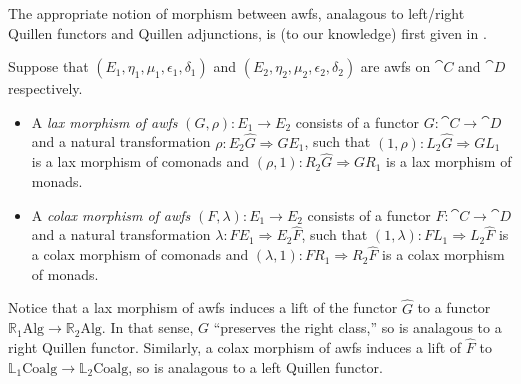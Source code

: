 The appropriate notion of morphism between awfs, analagous to left/right Quillen functors and Quillen adjunctions, is (to our knowledge) first given in \cite{riehl:nwfs-model}.

\begin{definition}
	Suppose that $(E_1,\eta_1,\mu_1,\epsilon_1,\delta_1)$ and $(E_2,\eta_2,\mu_2,\epsilon_2,\delta_2)$ are awfs on $\cat{C}$ and $\cat{D}$ respectively. 
	\begin{itemize}
		\item A \emph{lax morphism of awfs} $(G,\rho)\colon E_1\to E_2$ consists of a functor $G\colon\cat{C}\to\cat{D}$ and a natural transformation $\rho\colon E_2\hat{G}\Rightarrow GE_1$, such that $(1,\rho)\colon L_2\hat{G}\Rightarrow GL_1$ is a lax morphism of comonads and $(\rho,1)\colon R_2\hat{G}\Rightarrow GR_1$ is a lax morphism of monads.
		\item A \emph{colax morphism of awfs} $(F,\lambda)\colon E_1\to E_2$ consists of a functor $F\colon\cat{C}\to\cat{D}$ and a natural transformation $\lambda\colon FE_1\Rightarrow E_2\hat{F}$, such that $(1,\lambda)\colon FL_1\Rightarrow L_2\hat{F}$ is a colax morphism of comonads and $(\lambda,1)\colon FR_1\Rightarrow R_2\hat{F}$ is a colax morphism of monads.
	\end{itemize}
\end{definition}

Notice that a lax morphism of awfs induces a lift of the functor $\hat{G}$ to a functor $\mathbb{R}_1\mathrm{Alg}\to \mathbb{R}_2\mathrm{Alg}$. In that sense, $G$ ``preserves the right class,'' so is analagous to a right Quillen functor. Similarly, a colax morphism of awfs induces a lift of $\hat{F}$ to $\mathbb{L}_1\mathrm{Coalg}\to\mathbb{L}_2\mathrm{Coalg}$, so is analagous to a left Quillen functor.

